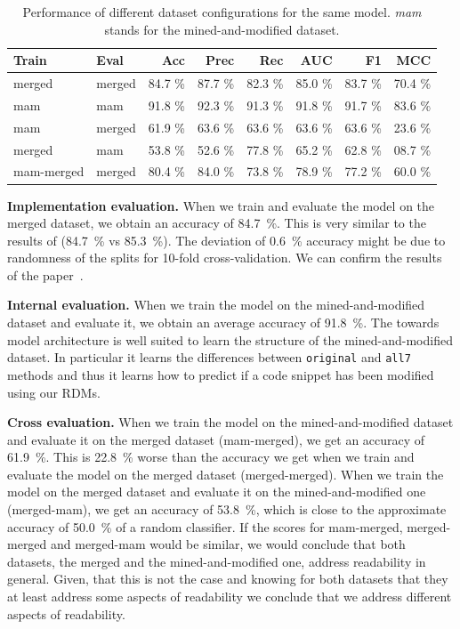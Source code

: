 \documentclass[%
class=scrreprt,
chapterprefix=false,%
open=right,%
twoside=false,%
paper=a4,%
logofile={Logo\_zentral\_farbig\_EN.png},%
thesistype=master,%
UKenglish,%
]{se2thesis}
\theoremstyle{definition}
\newcommand{\rdhs}{RDMs\xspace}
\begin{document}
	\begin{table}[tb]
		\centering
		\caption{Performance of different dataset configurations for the same model. \textit{mam} stands for the mined-and-modified dataset. 
		}
		\vspace{8pt}
		\label{tab:dataset_performance}
		\begin{tabular}{llrrrrrr}
			\toprule
			Train & Eval & Acc & Prec & Rec & AUC & F1 & MCC \\
			\midrule
			merged      & merged   	& 84.7 \% & 87.7 \% & 82.3 \% & 85.0 \% & 83.7 \% & 70.4 \% \\
			mam        	& mam    	& 91.8 \% & 92.3 \% & 91.3 \% & 91.8 \% & 91.7 \% & 83.6 \% \\
			mam			& merged    & 61.9 \% & 63.6 \% & 63.6 \% & 63.6 \% & 63.6 \% & 23.6 \% \\
			merged      & mam	    & 53.8 \% & 52.6 \% & 77.8 \% & 65.2 \% & 62.8 \% & 08.7 \% \\
			mam-merged 	& merged    & 80.4 \% & 84.0 \% & 73.8 \% & 78.9 \% & 77.2 \% & 60.0 \% \\
			\bottomrule
		\end{tabular}
	\end{table}
	
	\textbf{Implementation evaluation.}
	When we train and evaluate the model on the merged dataset, we obtain an accuracy of 84.7~\%. This is very similar to the results of \citeauthor{mi2022towards} (84.7~\% vs 85.3~\%). The deviation of 0.6~\% accuracy might be due to randomness of the splits for 10-fold cross-validation. We can confirm the results of the paper~\cite{mi2022towards}.
	
	\textbf{Internal evaluation.}
	When we train the model on the mined-and-modified dataset and evaluate it, we obtain an average accuracy of 91.8~\%. 
	The towards model architecture is well suited to learn the structure of the mined-and-modified dataset. In particular it learns the differences between \texttt{original} and \texttt{all7} methods and thus it learns how to predict if a code snippet has been modified using our \rdhs. 

	\textbf{Cross evaluation.}
	When we train the model on the mined-and-modified dataset and evaluate it on the merged dataset (mam-merged), we get an accuracy of 61.9~\%. This is 22.8~\% worse than the accuracy we get when we train and evaluate the model on the merged dataset (merged-merged). When we train the model on the merged dataset and evaluate it on the mined-and-modified one (merged-mam), we get an accuracy of 53.8~\%, which is close to the approximate accuracy of 50.0~\% of a random classifier.
	If the scores for mam-merged, merged-merged and merged-mam would be similar, we would conclude that both datasets, the merged and the mined-and-modified one, address readability in general. Given, that this is not the case and knowing for both datasets that they at least address some aspects of readability we conclude that we address different aspects of readability.
	
\end{document}
